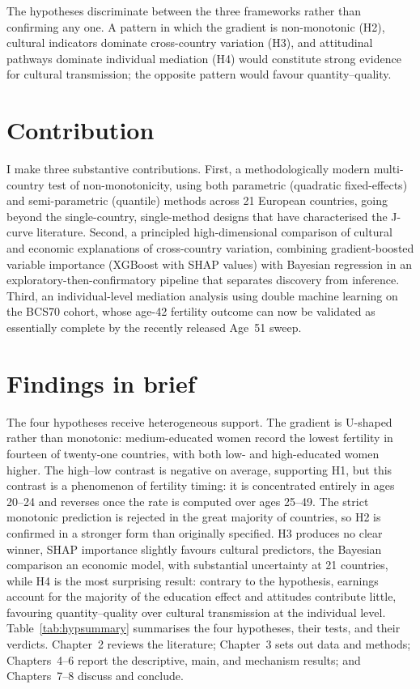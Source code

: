 \documentclass[12pt,a4paper]{report}
\begin{document}
The hypotheses discriminate between the three frameworks rather than confirming any one. A pattern in
which the gradient is non-monotonic (H2), cultural indicators dominate cross-country variation (H3), and
attitudinal pathways dominate individual mediation (H4) would constitute strong evidence for cultural
transmission; the opposite pattern would favour quantity--quality.

\section{Contribution}
I make three substantive contributions. First, a methodologically modern multi-country test of
non-monotonicity, using both parametric (quadratic fixed-effects) and semi-parametric (quantile)
methods across 21 European countries, going beyond the single-country, single-method designs that
have characterised the J-curve literature. Second, a principled high-dimensional comparison of
cultural and economic explanations of cross-country variation, combining gradient-boosted
variable importance (XGBoost with SHAP values) with Bayesian regression in an
exploratory-then-confirmatory pipeline that separates discovery from inference. Third, an
individual-level mediation analysis using double
machine learning \citep{chernozhukov2018} on the BCS70 cohort, whose age-42 fertility outcome
can now be validated as essentially complete by the recently released Age~51 sweep.

\section{Findings in brief}
The four hypotheses receive heterogeneous support. The gradient is U-shaped rather than
monotonic: medium-educated women record the lowest fertility in fourteen of twenty-one countries, with
both low- and high-educated women higher. The high--low contrast is negative on average, supporting H1,
but this contrast is a phenomenon of fertility timing: it is concentrated entirely in ages 20--24 and
reverses once the rate is computed over ages 25--49. The strict monotonic prediction is rejected in the
great majority of countries, so H2 is confirmed in a stronger form than originally specified. H3
produces no clear winner, SHAP importance slightly favours cultural predictors, the Bayesian
comparison an economic model, with substantial uncertainty at 21 countries, while H4 is the most
surprising result: contrary to the hypothesis, earnings account for the majority of the education
effect and attitudes contribute little, favouring quantity--quality over cultural transmission at the
individual level. Table~\ref{tab:hypsummary} summarises the four hypotheses, their tests, and their
verdicts. Chapter~2 reviews the literature; Chapter~3 sets out data and methods; Chapters~4--6
report the descriptive, main, and mechanism results; and Chapters~7--8 discuss and conclude.
\end{document}
